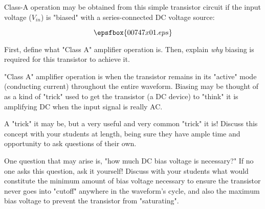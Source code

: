 

Class-A operation may be obtained from this simple transistor circuit if the input voltage ($V_{in}$) is "biased" with a series-connected DC voltage source:

$$\epsfbox{00747x01.eps}$$

First, define what "Class A" amplifier operation is.  Then, explain {\it why} biasing is required for this transistor to achieve it.







"Class A" amplifier operation is when the transistor remains in its "active" mode (conducting current) throughout the entire waveform.  Biasing may be thought of as a kind of "trick" used to get the transistor (a DC device) to "think" it is amplifying DC when the input signal is really AC.







A "trick" it may be, but a very useful and very common "trick" it is!  Discuss this concept with your students at length, being sure they have ample time and opportunity to ask questions of their own.  

One question that may arise is, "how much DC bias voltage is necessary?"  If no one asks this question, ask it yourself!  Discuss with your students what would constitute the minimum amount of bias voltage necessary to ensure the transistor never goes into "cutoff" anywhere in the waveform's cycle, and also the maximum bias voltage to prevent the transistor from "saturating".




